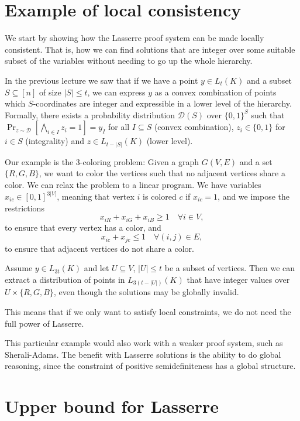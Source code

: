 \documentclass[a4paper,twoside,justified]{tufte-handout}
\begin{document}
 
\vspace{-1cm}
\section{Example of local consistency}

We start by showing how the Lasserre proof system can be made locally consistent. That is, how we can find solutions that are integer over some suitable subset of the variables without needing to go up the whole hierarchy.

In the previous lecture we saw that if we have a point $y\in L_t(K)$ and a subset $S\subseteq [n]$ of size $|S| \leq t$, we can express $y$ as a convex combination of points which $S$-coordinates are integer and expressible in a lower level of the hierarchy. Formally, there exists a probability distribution $\mathcal{D}(S)$ over $\{0,1\}^S$ such that $\Pr_{z \sim \mathcal{D}} [ \bigwedge_{i \in I} z_i =1 ] = y_I$ for all $I\subseteq S$ (convex combination), $z_i \in \{0,1\}$ for $i\in S$ (integrality) and $z \in L_{t - |S|}(K)$ (lower level).

Our example is the 3-coloring problem: Given a graph $G(V,E)$ and a set $\{R,G,B\}$, we want to color the vertices such that no adjacent vertices share a color. We can relax the problem to a linear program. We have variables $x_{ic} \in [0,1]^{3|V|}$, meaning that vertex $i$ is colored $c$ if $x_{ic}=1$, and we impose the restrictions 
\[x_{iR}+x_{iG}+x_{iB} \geq 1 \quad \forall i\in V,\] 
to ensure that every vertex has a color, and 
\[x_{ic} + x_{jc} \leq 1 \quad \forall (i,j) \in E,\]
to ensure that adjacent vertices do not share a color.

Assume $y \in L_{3t}(K)$ and let $U \subseteq V$, $|U| \leq t$ be a subset of vertices. Then we can extract a distribution of points in $L_{3(t-|U|)}(K)$ that have integer values over $U \times \{R,G,B\}$, even though the solutions may be globally invalid.

This means that if we only want to satisfy local constraints, we do not need the full power of Lasserre. 

This particular example would also work with a weaker proof system, such as Sherali-Adams. The benefit with Lasserre solutions is the ability to do global reasoning, since the constraint of positive semidefiniteness has a global structure.

\section{Upper bound for Lasserre}
\end{document}
